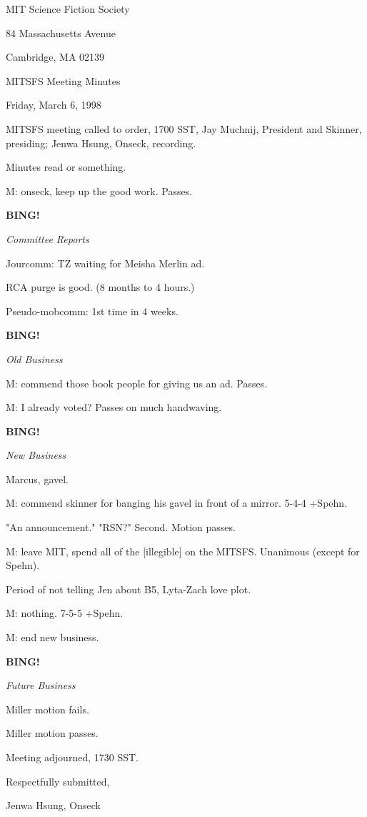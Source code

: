 \documentclass[12pt]{article}
\newcommand{\bing}{{\bf BING!} }
\newcommand{\goto}[1]{\bing \vskip 12pt \centerline{{\em{#1}}}}
\begin{document}
\begin{center}

MIT Science Fiction Society 

84 Massachusetts Avenue

Cambridge, MA 02139

\vspace{12pt}

MITSFS Meeting Minutes 

Friday, March 6, 1998

\end{center}
 
\vspace{18pt}

\setlength{\parskip}{6pt}

\noindent
MITSFS meeting called to order, 1700 SST,
Jay Muchnij, President and Skinner, presiding; Jenwa Hsung, Onseck, recording.

Minutes read or something.

M: onseck, keep up the good work. Passes.

\goto{Committee Reports}

Jourcomm: TZ waiting for Meisha Merlin ad.

RCA purge is good. (8 months to 4 hours.)

Pseudo-mobcomm: 1st time in 4 weeks.

\goto{Old Business}

M: commend those book people for giving us an ad. Passes.

M: I already voted? Passes on much handwaving.

\goto{New Business}

Marcus, gavel.

M: commend skinner for banging his gavel in front of a mirror. 5-4-4 +Spehn.

"An announcement." "RSN?" Second. Motion passes.

M: leave MIT, spend all of the [illegible] on the MITSFS. Unanimous (except for Spehn).

Period of not telling Jen about B5, Lyta-Zach love plot.

M: nothing. 7-5-5 +Spehn.

M: end new business.

\goto{Future Business}

Miller motion fails.

Miller motion passes.

\vspace{12pt}

\noindent
Meeting adjourned, 1730 SST.

\vspace{18pt}

\centerline{Respectfully submitted,}
\centerline{Jenwa Hsung, Onseck}
\end{document}
